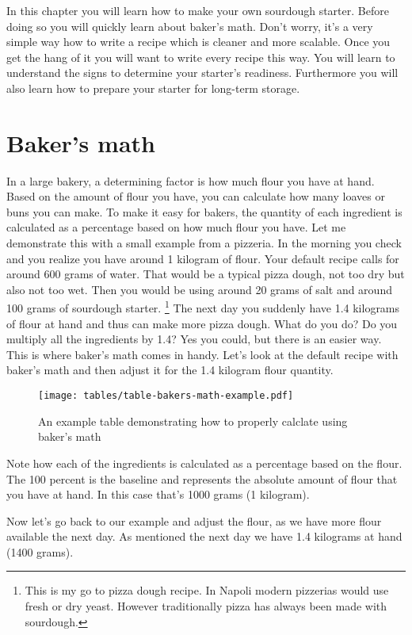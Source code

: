 In this chapter you will learn how to make your
own sourdough starter. Before doing so you will
quickly learn about baker's math. Don't worry,
it's a very simple way how to write a recipe which
is cleaner and more scalable.  Once you get the hang
of it you will want to write every recipe this way.
You will learn to understand the signs to determine
your starter's readiness.  Furthermore you will
also learn how to prepare your starter for long-term storage.

\section{Baker's math}
\label{section:bakers-math}

In a large bakery, a determining factor is how
much flour you have at hand. Based on the amount
of flour you have, you can calculate how many
loaves or buns you can make. To make it easy
for bakers, the quantity of each ingredient
is calculated as a percentage based on how much flour you have.
Let me demonstrate this with a small example from
a pizzeria.  In the morning you check and you realize you
have around 1 kilogram of flour.
Your default recipe calls for around 600 grams of water.
That would be a typical pizza dough, not too dry but
also not too wet. Then you would be using around 20 grams
of salt and around 100 grams of sourdough starter.
\footnote{This is my go to pizza dough recipe. In Napoli
modern pizzerias would use fresh or dry yeast. However
traditionally pizza has always been made with sourdough.}
The next day you suddenly have 1.4 kilograms of flour
at hand and thus can make more pizza dough. What do you do?
Do you multiply all the ingredients by 1.4? Yes you could,
but there is an easier way. This is where baker's math
comes in handy. Let's look at the default recipe with baker's
math and then adjust it for the 1.4 kilogram flour quantity.

\begin{figure}[!htb]
  \texttt{[image: tables/table-bakers-math-example.pdf]}
  \caption{An example table demonstrating how to properly calclate using baker's math}
\end{figure}

Note how each of the ingredients is calculated as a percentage
based on the flour.  The 100 percent is the baseline and represents the absolute
amount of flour that you have at hand. In this case that's 1000 grams
(1 kilogram).

Now let's go back to our example and adjust the flour, as we have
more flour available the next day. As mentioned the next day
we have 1.4 kilograms at hand (1400 grams).

